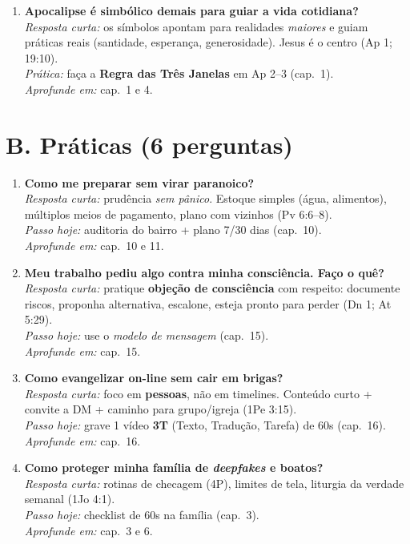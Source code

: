\begin{enumerate}[leftmargin=*,label=\textbf{T\arabic*.}]
\item \textbf{Apocalipse é simbólico demais para guiar a vida cotidiana?}\\
\textit{Resposta curta:} os símbolos apontam para realidades \emph{maiores} e guiam práticas reais (santidade, esperança, generosidade). Jesus é o centro (Ap 1; 19:10).\\
\textit{Prática:} faça a \textbf{Regra das Três Janelas} em Ap 2--3 (cap.~1).\\
\textit{Aprofunde em:} cap.~1 e 4.
\end{enumerate}

\section*{B. Práticas (6 perguntas)}

\begin{enumerate}[leftmargin=*,label=\textbf{P\arabic*.}]
\item \textbf{Como me preparar sem virar paranoico?}\\
\textit{Resposta curta:} prudência \emph{sem pânico}. Estoque simples (água, alimentos), múltiplos meios de pagamento, plano com vizinhos (Pv 6:6--8).\\
\textit{Passo hoje:} auditoria do bairro + plano 7/30 dias (cap.~10).\\
\textit{Aprofunde em:} cap.~10 e 11.

\item \textbf{Meu trabalho pediu algo contra minha consciência. Faço o quê?}\\
\textit{Resposta curta:} pratique \textbf{objeção de consciência} com respeito: documente riscos, proponha alternativa, escalone, esteja pronto para perder (Dn 1; At 5:29).\\
\textit{Passo hoje:} use o \emph{modelo de mensagem} (cap.~15).\\
\textit{Aprofunde em:} cap.~15.

\item \textbf{Como evangelizar on-line sem cair em brigas?}\\
\textit{Resposta curta:} foco em \textbf{pessoas}, não em timelines. Conteúdo curto + convite a DM + caminho para grupo/igreja (1Pe 3:15).\\
\textit{Passo hoje:} grave 1 vídeo \textbf{3T} (Texto, Tradução, Tarefa) de 60s (cap.~16).\\
\textit{Aprofunde em:} cap.~16.

\item \textbf{Como proteger minha família de \textit{deepfakes} e boatos?}\\
\textit{Resposta curta:} rotinas de checagem (4P), limites de tela, liturgia da verdade semanal (1Jo 4:1).\\
\textit{Passo hoje:} checklist de 60s na família (cap.~3).\\
\textit{Aprofunde em:} cap.~3 e 6.


\end{enumerate}
